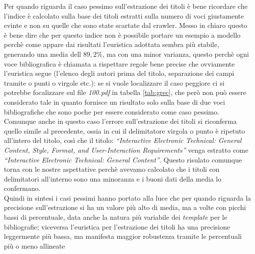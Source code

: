 \begin{description}
Per quando riguarda il caso pessimo sull'estrazione dei titoli è bene ricordare che l'indice è calcolato sulla base dei titoli estratti sulla numero di voci giustamente evinte e non su quelle che sono state scartate dal crawler. Messo in chiaro questo è bene dire che per questo indice non è possibile portare un esempio a modello perchè come appare dai risultati l'euristica adottata sembra più stabile, generando una media dell $89,2\%$, ma con una minor varianza, questo perchè ogni voce bibliografica è chiamata a rispettare regole bene precise che ovviamente l'euristica segue (l'elenco degli autori prima del titolo, separazione dei campi tramite o punti o virgole etc.): se si vuole localizzare il caso peggiore ci si potrebbe focalizzare sul file \textit{100.pdf} in tabella \ref{tab:grec}, che però non può essere considerato tale in quanto fornisce un risultato solo sulla base di due voci bibliografiche che sono poche per essere considerato come caso pessimo. Comunque anche in questo caso l'errore sull'estrazione dei titoli si riconferma quello simile al precedente, ossia in cui il delimitatore virgola o punto è ripetuto all'intero del titolo, così che il titolo: \textit{``Interactive Electronic Technical: General Content, Style, Format, and User-Interaction Requirements''} venga estratto come \textit{``Interactive Electronic Technical: General Content''}. Questo risulato comunque torna con le nostre aspettative perchè avevamo calcolato che i titoli con delimitatori all'interno sono una minoranza e i buoni dati della media lo confermano.\\ 

Quindi in sintesi i casi pessimi hanno portato alla luce che per quando riguarda la precisione sull'estrazione si ha un valore più alto di media, ma a volte con picchi bassi di percentuale, data anche la natura più variabile dei \textit{template} per le bibliografie; viceversa l'euristica per l'estrazione dei titoli ha una precisione leggermente più bassa, ma manifesta maggior robustezza tramite le percentuali più o meno allineate


\end{description}
